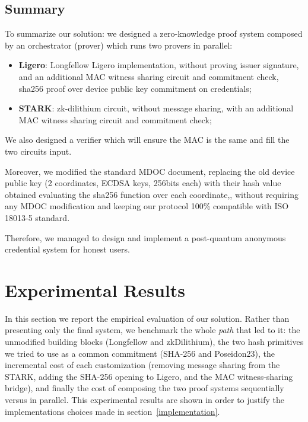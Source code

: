 \documentclass[binding=0.6cm,oneside,noexaminfo]{sapthesis}
\begin{document}
\section{Summary}
To summarize our solution: we designed a zero-knowledge proof system
composed by an orchestrator (prover) which runs two provers in parallel:
\begin{itemize}
  \item \textbf{Ligero}: Longfellow Ligero implementation, without proving issuer signature,
  and an additional MAC witness sharing circuit and commitment check, sha256 proof over device public key commitment
  on credentials;
  \item \textbf{STARK}: zk-dilithium circuit, without message sharing, with an additional MAC witness sharing circuit
  and commitment check;
\end{itemize}
We also designed a verifier which will ensure the MAC is the same and fill the two circuits input.

Moreover, we modified the standard MDOC document, replacing the old
device public key (2 coordinates, ECDSA keys, 256bits each) with their hash value obtained 
evaluating the sha256 function over each coordinate,,
without requiring any MDOC modification and keeping our protocol 100\% compatible
with ISO 18013-5 standard.

Therefore, we managed to design and implement a post-quantum
anonymous credential system for honest users. 

\chapter{Experimental Results}
\label{results}
In this section we report the empirical evaluation of our solution. Rather than
presenting only the final system, we benchmark the whole \emph{path} that led to
it: the unmodified building blocks (Longfellow and zkDilithium), the two hash
primitives we tried to use as a common commitment (SHA-256 and Poseidon23), the
incremental cost of each customization (removing message sharing from the STARK,
adding the SHA-256 opening to Ligero, and the MAC witness-sharing bridge), and
finally the cost of composing the two proof systems sequentially versus in
parallel. This experimental results are shown in order to justify the implementations choices
made in section~\ref{implementation}.
\end{document}
